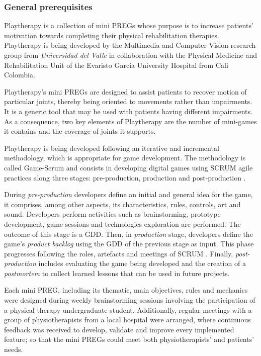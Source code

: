 \subsubsection{General prerequisites}
Playtherapy is a collection of mini \acp{PREG} whose purpose is to increase patients' motivation towards completing their physical rehabilitation therapies. Playtherapy is being developed by the Multimedia and Computer Vision research group from \textit{Universidad del Valle} in collaboration with the Physical Medicine and Rehabilitation Unit of the Evaristo Garc\'ia University Hospital from Cali Colombia. 

Playtherapy's mini \acp{PREG} are designed to assist patients to recover motion of particular joints, thereby being oriented to movements rather than impairments. It is a generic tool that may be used with patients having different impairments. As a consequence, two key elements of Playtherapy are the number of mini-games it contains and the coverage of joints it supports.

Playtherapy is being developed following an iterative and incremental methodology, which is appropriate for game development. The methodology is called Game-Scrum and consists in developing digital games using SCRUM agile practices along three stages: pre-production, production and post-production \autocite{godoy2010game}.

During \emph{pre-production} developers define an initial and general idea for the game, it comprises, among other aspects, its characteristics, rules, controls, art and sound. Developers perform activities such as brainstorming, prototype development, game sessions and technologies exploration are performed. The outcome of this stage is a \ac{GDD}. Then, in \emph{production} stage, developers define the game's \textit{product backlog} using the \ac{GDD} of the previous stage as input. This phase progresses following the roles, artefacts and meetings of SCRUM \autocite{keith_agile_2010}. Finally, \emph{post-production} includes evaluating the game being developed and the creation of a \textit{postmortem} to collect learned lessons that can be used in future projects.

Each mini \ac{PREG}, including its thematic, main objectives, rules and mechanics were designed during weekly brainstorming sessions involving the participation of a physical therapy undergraduate student. Additionally, regular meetings with a group of physiotherapists from a local hospital were arranged, where continuous feedback was received to develop, validate and improve every implemented feature; so that the mini \acp{PREG} could meet both physiotherapists' and patients' needs.

